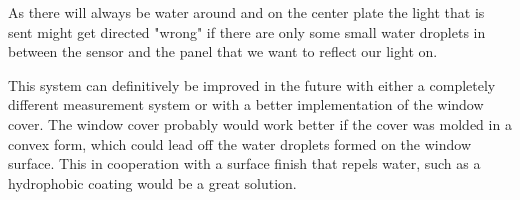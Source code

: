 As there will always be water around and on the center plate the light that is sent might get directed "wrong" if there are only some small water droplets in between the sensor and the panel that we want to reflect our light on.  

This system can definitively be improved in the future with either a completely different measurement system or with a better implementation of the window cover. The window cover probably would work better if the cover was molded in a convex form, which could lead off the water droplets formed on the window surface. This in cooperation with a surface finish that repels water, such as a hydrophobic coating would be a great solution. 


